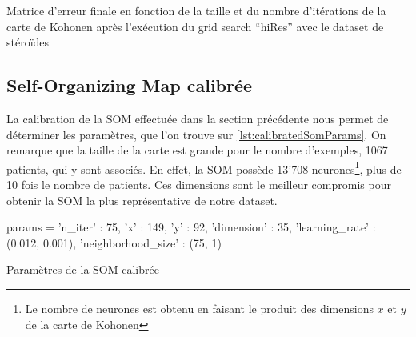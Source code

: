     \begin{table}[H]
        \centering
        
        \caption{Matrice d'erreur finale en fonction de la taille et du nombre d'itérations de la carte de Kohonen après l'exécution du grid search ``hiRes'' avec le dataset de stéroïdes}
        \label{tab:errorMatrixHiRes}
    \end{table}


\subsection{Self-Organizing Map calibrée}
\label{sct:calibratedSOM}

    La calibration de la SOM effectuée dans la section précédente nous permet de déterminer les paramètres, que l'on trouve sur \autoref{lst:calibratedSomParams}. On remarque que la taille de la carte est grande pour le nombre d'exemples, 1067 patients, qui y sont associés. En effet, la SOM possède 13'708 neurones\footnote{Le nombre de neurones est obtenu en faisant le produit des dimensions $x$ et $y$ de la carte de Kohonen}, plus de 10 fois le nombre de patients. Ces dimensions sont le meilleur compromis pour obtenir la SOM la plus représentative de notre dataset. 



    \begin{listing}[H]
    \begin{pythoncode}
    params = {
                'n_iter' : 75, 
                'x' : 149,
                'y' : 92,
                'dimension' : 35,
                'learning_rate' : (0.012, 0.001),
                'neighborhood_size' : (75, 1) 
            }
    \end{pythoncode}
    \caption{Paramètres de la SOM calibrée}
    \label{lst:calibratedSomParams}
    \end{listing}

